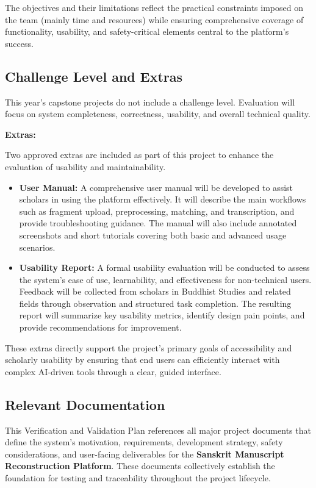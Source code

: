 \documentclass[12pt, titlepage]{article}
\begin{document}
The objectives and their limitations reflect the practical constraints imposed on the team (mainly time and resources) while ensuring comprehensive coverage of functionality, usability, and safety-critical elements central to the platform’s success.


\subsection{Challenge Level and Extras}

This year’s capstone projects do not include a challenge level. Evaluation will focus on system completeness, correctness, usability, and overall technical quality.

\textbf{Extras:}

Two approved extras are included as part of this project to enhance the evaluation of usability and maintainability.

\begin{itemize}
    \item \textbf{User Manual:}  
    A comprehensive user manual will be developed to assist scholars in using the platform effectively. It will describe the main workflows such as fragment upload, preprocessing, matching, and transcription, and provide troubleshooting guidance. The manual will also include annotated screenshots and short tutorials covering both basic and advanced usage scenarios.

    \item \textbf{Usability Report:}  
    A formal usability evaluation will be conducted to assess the system’s ease of use, learnability, and effectiveness for non-technical users. Feedback will be collected from scholars in Buddhist Studies and related fields through observation and structured task completion. The resulting report will summarize key usability metrics, identify design pain points, and provide recommendations for improvement.
\end{itemize}

These extras directly support the project’s primary goals of accessibility and scholarly usability by ensuring that end users can efficiently interact with complex AI-driven tools through a clear, guided interface.

\subsection{Relevant Documentation}

This Verification and Validation Plan references all major project documents that define the system’s motivation, requirements, development strategy, safety considerations, and user-facing deliverables for the \textbf{Sanskrit Manuscript Reconstruction Platform}. These documents collectively establish the foundation for testing and traceability throughout the project lifecycle.
\end{document}
